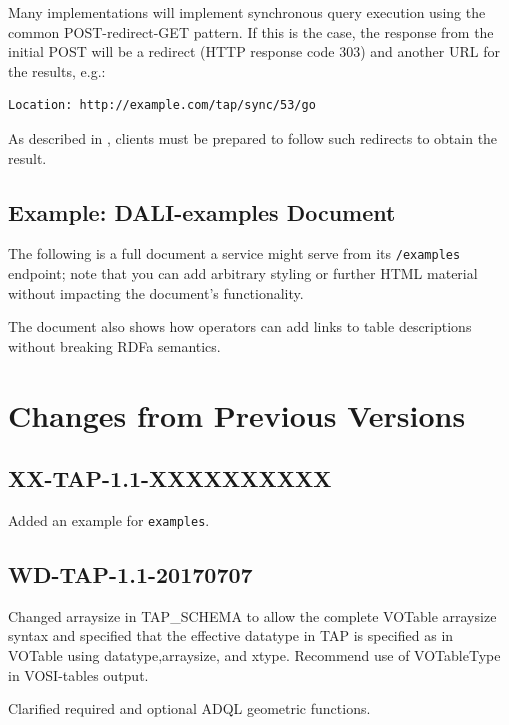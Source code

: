 \documentclass[11pt,letter]{ivoa}
\begin{document}
Many implementations will implement synchronous query execution using the 
common POST-redirect-GET pattern. If this is the case, the response from the 
initial POST will be a redirect (HTTP response code 303) and another URL for the 
results, e.g.: 

\begin{verbatim}
Location: http://example.com/tap/sync/53/go
\end{verbatim}

As described in \citep{std:DALI}, clients must be prepared to follow such 
redirects to obtain the result.

\subsection{Example: DALI-examples Document}

The following is a full document a service might serve from its
\verb|/examples| endpoint; note that you can add arbitrary styling or
further HTML material without impacting the document's functionality.

The document also shows how operators can add links to table
descriptions without breaking RDFa semantics.



\appendix

\section{Changes from Previous Versions}

\subsection{XX-TAP-1.1-XXXXXXXXXX}

Added an example for \verb|examples|.

\subsection{WD-TAP-1.1-20170707}

Changed arraysize in TAP\_SCHEMA to allow the complete VOTable arraysize syntax and specified that the effective datatype in TAP is specified as in VOTable using datatype,arraysize, and xtype. Recommend use of VOTableType in VOSI-tables output.

Clarified required and optional ADQL geometric functions.
\end{document}
